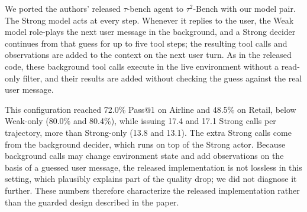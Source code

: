 \documentclass[11pt, copyright, logo, secondlogo]{template/lark}
\begin{document}
We ported the authors' released $\tau$-bench agent to $\tau^2$-Bench with our
model pair. The Strong model acts at every step. Whenever it replies to the
user, the Weak model role-plays the next user message in the background, and
a Strong decider continues from that guess for up to five tool steps; the
resulting tool calls and observations are added to the context on the next
user turn. As in the released code, these background tool calls execute in
the live environment without a read-only filter, and their results are added
without checking the guess against the real user message.

This configuration reached 72.0\% Pass@1 on Airline and 48.5\% on Retail,
below Weak-only (80.0\% and 80.4\%), while issuing 17.4 and 17.1 Strong calls
per trajectory, more than Strong-only (13.8 and 13.1). The extra Strong calls
come from the background decider, which runs on top of the Strong actor.
Because background calls may change environment state and add observations on
the basis of a guessed user message, the released implementation is not
lossless in this setting, which plausibly explains part of the quality drop;
we did not diagnose it further. These numbers therefore characterize the
released implementation rather than the guarded design described in the
paper.
 
\end{document}
